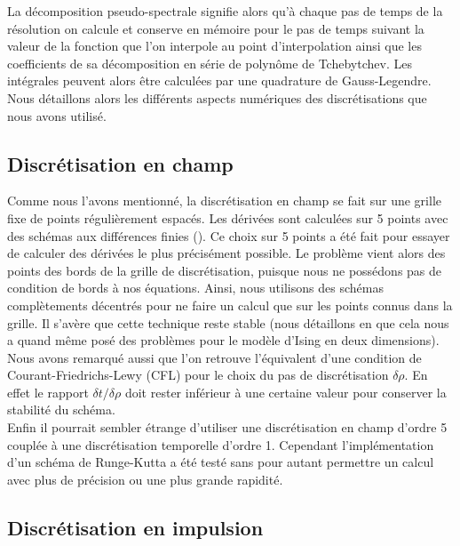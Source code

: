 \documentclass[10.5pt]{article}
\begin{document}
\begin{multicols*}{2}
La décomposition pseudo-spectrale signifie alors qu'à chaque pas de temps de la résolution on calcule et conserve en mémoire pour le pas de temps suivant la valeur de la fonction que l'on interpole au point d'interpolation ainsi que les coefficients de sa décomposition en série de polynôme de Tchebytchev. Les intégrales peuvent alors être calculées par une quadrature de Gauss-Legendre. \\

Nous détaillons alors les différents aspects numériques des discrétisations que nous avons utilisé.




\subsection{Discrétisation en champ}

Comme nous l'avons mentionné, la discrétisation en champ se fait sur une grille fixe de points régulièrement espacés. Les dérivées sont calculées sur 5 points avec des schémas aux différences finies (). Ce choix sur 5 points  a été fait pour essayer de calculer des dérivées le plus précisément possible. Le problème vient alors des points des bords de la grille de discrétisation, puisque nous ne possédons pas de condition de bords à nos équations. Ainsi, nous utilisons des schémas complètements décentrés pour ne faire un calcul que sur les points connus dans la grille. Il s'avère que cette technique reste stable (nous détaillons en  que cela nous a quand même posé des problèmes pour le modèle d'Ising en deux dimensions). \\

Nous avons remarqué aussi que l'on retrouve l'équivalent d'une condition de Courant-Friedrichs-Lewy (CFL) \cite{courant1967partial} pour le choix du pas de discrétisation $\delta \rho$. En effet le rapport $\delta t / \delta\rho$ doit rester inférieur à une certaine valeur pour conserver la stabilité du schéma.\\

Enfin il pourrait sembler étrange d'utiliser une discrétisation en champ d'ordre 5 couplée à une discrétisation temporelle d'ordre 1. Cependant l'implémentation d'un schéma de Runge-Kutta a été testé sans pour autant permettre un calcul avec plus de précision ou une plus grande rapidité. 


\vspace*{11pt}

\subsection{Discrétisation en impulsion}


\end{multicols*}
\end{document}
